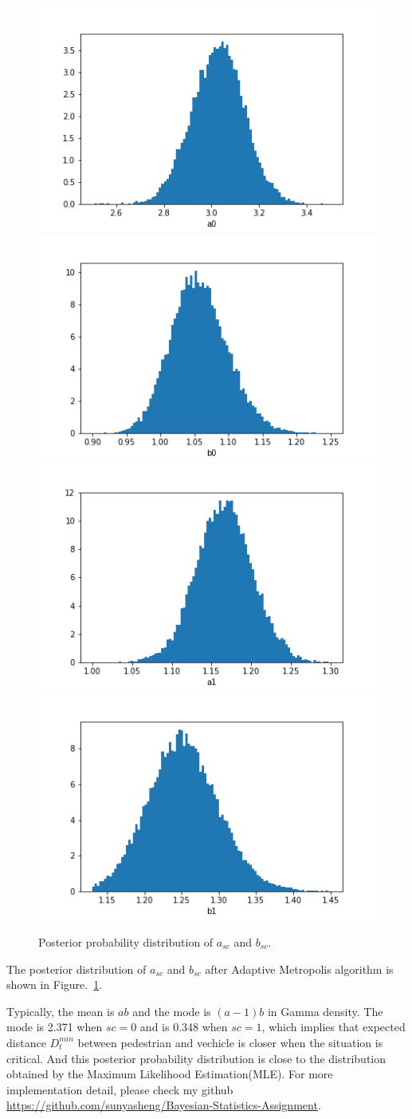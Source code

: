 \documentclass[10pt,twocolumn,letterpaper]{article}
\begin{document}
    \begin{figure}[t]
        \includegraphics[width=0.49\linewidth]{images/a0.png}
        \includegraphics[width=0.49\linewidth]{images/b0.png}
        \includegraphics[width=0.49\linewidth]{images/a1.png}
        \includegraphics[width=0.49\linewidth]{images/b1.png}
        \caption{Posterior probability distribution of $a_{sc}$ and $b_{sc}$.}
        \label{fig:long}
        \label{fig:onecol}
        \label{post_gamma_sc}
    \end{figure}
    The posterior distribution of $a_{sc}$ and $b_{sc}$ after Adaptive Metropolis algorithm is shown in Figure.~\ref{post_gamma_sc}.

    Typically, the mean is $ab$ and the mode is $(a-1)b$ in Gamma density. The mode is 2.371 when $sc = 0$ and is 0.348 when $sc = 1$,
    which implies that expected distance $D_t^{min}$ between pedestrian and
    vechicle is closer when the situation is critical.
    And this posterior probability distribution is close to the distribution obtained by the Maximum Likelihood Estimation(MLE).
    For more implementation detail, please check my github \url{https://github.com/sunyasheng/Bayesian-Statistics-Assignment}. 
\end{document}
